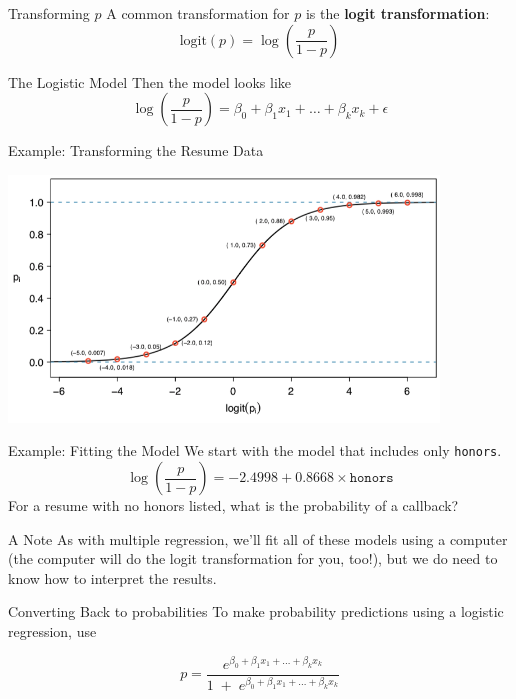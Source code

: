 \begin{frame}{Transforming $p$}
    A common transformation for $p$ is the \textbf{logit transformation}:
    \[
        \text{logit}(p) = \log\left(\frac{p}{1-p}\right)
    \]
\end{frame}

\begin{frame}{The Logistic Model}
    Then the model looks like
    \vspace{12pt}\Large{\[
        \log\left(\frac{p}{1-p}\right) = \beta_0 + \beta_1x_1 + \dots + \beta_kx_k + \epsilon
    \]}
\end{frame}

\begin{frame}{Example: Transforming the Resume Data}
    \begin{center}
        \includegraphics[width=4.5in]{images/logit.png}
    \end{center}
\end{frame}

\begin{frame}{Example: Fitting the Model}
    We start with the model that includes only \texttt{honors}.
    \[
        \log\left(\frac{p}{1-p}\right) = -2.4998 + 0.8668\times\texttt{honors}
    \]
    For a resume with no honors listed, what is the probability of a callback?
\end{frame}

\begin{frame}{A Note}
    As with multiple regression, we'll fit all of these models using a computer (the computer will do the logit transformation for you, too!), but we do need to know how to interpret the results.
\end{frame}

\begin{frame}{Converting Back to probabilities}
    To make probability predictions using a logistic regression, use
    
    \vspace{12pt}\Large{
    \[
        p = \frac{e^{\beta_0 + \beta_1x_1 + \dots + \beta_kx_k}}{1 \; + \; e^{\beta_0 + \beta_1x_1 + \dots + \beta_kx_k}}
    \]
    }
\end{frame}

